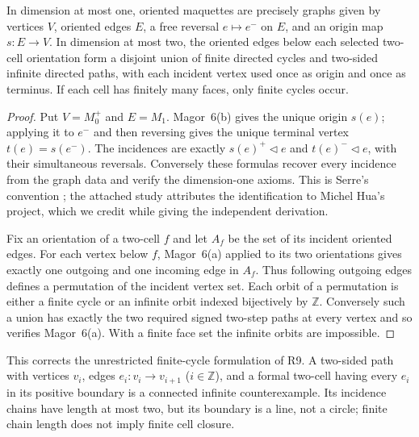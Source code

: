 \begin{theorem}
\label{SA21-C04}
In dimension at most one, oriented maquettes are precisely graphs given
by vertices $V$, oriented edges $E$, a free reversal $e\mapsto e^-$ on
$E$, and an origin map $s:E\to V$. In dimension at most two, the oriented
edges below each selected two-cell orientation form a disjoint union
of finite directed cycles and two-sided infinite directed paths, with
each incident vertex used once as origin and once as terminus.
If each cell has finitely many faces, only finite cycles occur.
\end{theorem}
\begin{proof}
Put $V=M_0^+$ and $E=M_1$. Magor~6(b) gives the unique origin
$s(e)$; applying it to $e^-$ and then reversing gives the unique
terminal vertex $t(e)=s(e^-)$. The incidences are exactly
$s(e)^+\triangleleft e$ and $t(e)^-\triangleleft e$, with their
simultaneous reversals. Conversely these formulas recover every incidence
from the graph data and verify the dimension-one axioms. This is Serre's
convention \citep[Chapter~I, \S2.1, p.~22]{Serre1977}; the attached
study attributes the identification to Michel Hua's project, which we
credit while giving the independent derivation.

Fix an orientation of a two-cell $f$ and let $A_f$ be the set of its
incident oriented edges. For each vertex below $f$, Magor~6(a) applied
to its two orientations gives exactly one outgoing and one incoming
edge in $A_f$. Thus following outgoing edges defines a permutation of
the incident vertex set. Each orbit of a permutation is either a finite
cycle or an infinite orbit indexed bijectively by $\mathbb Z$.
Conversely such a union has exactly the two required signed two-step
paths at every vertex and so verifies Magor~6(a). With a finite face set
the infinite orbits are impossible.
\end{proof}

This corrects the unrestricted finite-cycle formulation of R9. A
two-sided path with vertices $v_i$, edges $e_i:v_i\to v_{i+1}$
($i\in\mathbb Z$), and a formal two-cell having every $e_i$ in its
positive boundary is a connected infinite counterexample. Its
incidence chains have length at most two, but its boundary is a line,
not a circle; finite chain length does not imply finite cell closure.

